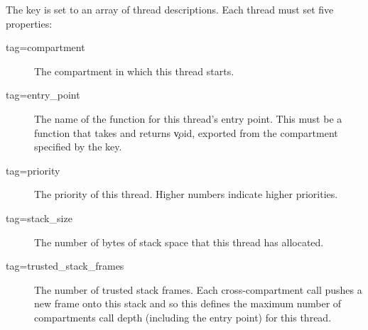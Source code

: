 The  key is set to an array of thread descriptions.
Each thread must set five properties:

\begin{description}
	\item[tag=compartment]{The compartment in which this thread starts.}
	\item[tag=entry_point]{The name of the function for this thread's entry point.
		This must be a function that takes and returns \c{void}, exported from the compartment specified by the  key.}
	\item[tag=priority]{The priority of this thread.
		Higher numbers indicate higher priorities.}
	\item[tag=stack_size]{The number of bytes of stack space that this thread has allocated.}
	\item[tag=trusted_stack_frames]{The number of trusted stack frames.
		Each cross-compartment call pushes a new frame onto this stack and so this defines the maximum number of compartments call depth (including the entry point) for this thread.}
\end{description}
